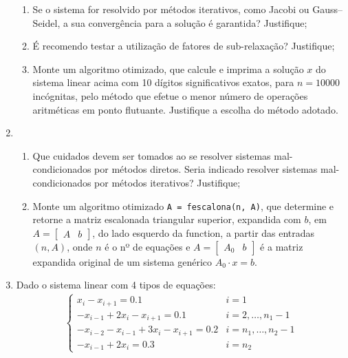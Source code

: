 \documentclass[12pt]{article}
\newenvironment{smallitem}{
    \vspace{-2mm}
    \begin{enumerate}
    \setlength{\parskip}{0pt}
    \setlength{\itemsep}{2pt}
}{
    \vspace{-2mm}
    \end{enumerate}
}
\begin{document}
\begin{enumerate}[label=\textbf{\arabic*})]
\begin{smallitem}

\item Se o sistema for resolvido por métodos iterativos, como Jacobi ou
Gauss--Seidel, a sua convergência para a solução é garantida? Justifique;

\item É recomendo testar a utilização de fatores de sub-relaxação? Justifique;

\item Monte um algoritmo otimizado, que calcule e imprima a solução $x$ do sistema
linear acima com 10 dígitos significativos exatos, para $n = 10000$ incógnitas, pelo
método que efetue o menor número de operações aritméticas em ponto flutuante.
Justifique a escolha do método adotado.

\end{smallitem}

\item \begin{smallitem}

\item Que cuidados devem ser tomados ao se resolver sistemas mal-condicionados
por métodos diretos. Seria indicado resolver sistemas mal-condicionados por
métodos iterativos? Justifique;

\item Monte um algoritmo otimizado \verb!A = fescalona(n, A)!, que determine e
retorne a matriz escalonada triangular superior, expandida com $b$, em $A =
\begin{bmatrix} A & b \end{bmatrix}$, do lado esquerdo da function, a partir das
entradas $(n, A)$, onde $n$ é o nº de equações e $A = \begin{bmatrix} A_0 & b
\end{bmatrix}$ é a matriz expandida original de um sistema genérico $A_0 \cdot x
= b$.

\end{smallitem}

\item Dado o sistema linear com 4 tipos de equações:
\begin{align*}
\begin{cases}
x_i - x_{i + 1} = 0.1 &
i = 1 \\
- x_{i - 1} + 2x_i - x_{i + 1} = 0.1 &
i = 2, \dots, n_1 - 1 \\
- x_{i - 2} - x_{i - 1} + 3x_i - x_{i + 1} = 0.2 &
i = n_1, \dots, n_2 - 1 \\
- x_{i - 1} + 2x_i = 0.3 &
i = n_2
\end{cases}
\end{align*}


\end{enumerate}
\end{document}
